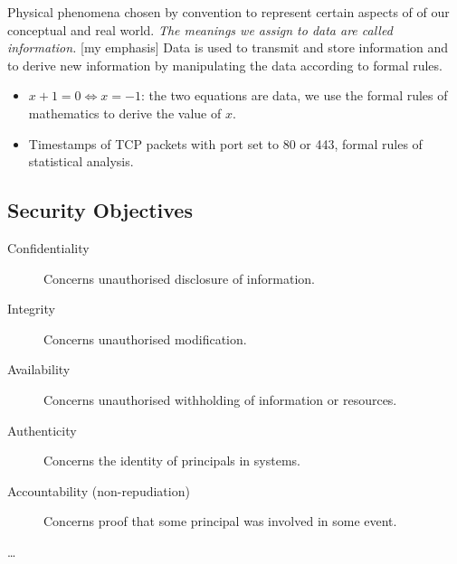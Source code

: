 \documentclass{beamer}
\begin{document}
\begin{frame}
  \begin{definition} Physical phenomena chosen by convention to represent certain 
    aspects of of our conceptual and real world.
    \emph{The meanings we assign to data are called information.} [my emphasis]
    Data is used to transmit and store information and to derive new 
    information by manipulating the data according to formal rules.
  \end{definition}
\end{frame}

\begin{frame}
  \begin{example}
    \begin{itemize}
      \item \(x + 1 = 0\iff x = -1\): the two equations are data, we use the 
        formal rules of mathematics to derive the value of \(x\).

      \item Timestamps of TCP packets with port set to 80 or 443, formal rules 
        of statistical analysis.
    \end{itemize}
  \end{example}
\end{frame}

\subsection{Security Objectives}

\begin{frame}
  \begin{description}
    \item[Confidentiality] Concerns unauthorised disclosure of information.
    \item[Integrity] Concerns unauthorised modification.
    \item[Availability] Concerns unauthorised withholding of information or 
      resources.

      \pause{}

    \item[Authenticity] Concerns the identity of principals in systems.
    \item[Accountability (non-repudiation)] Concerns proof that some principal 
      was involved in some event.
    \item[\dots]
  \end{description}
\end{frame}
\end{document}
